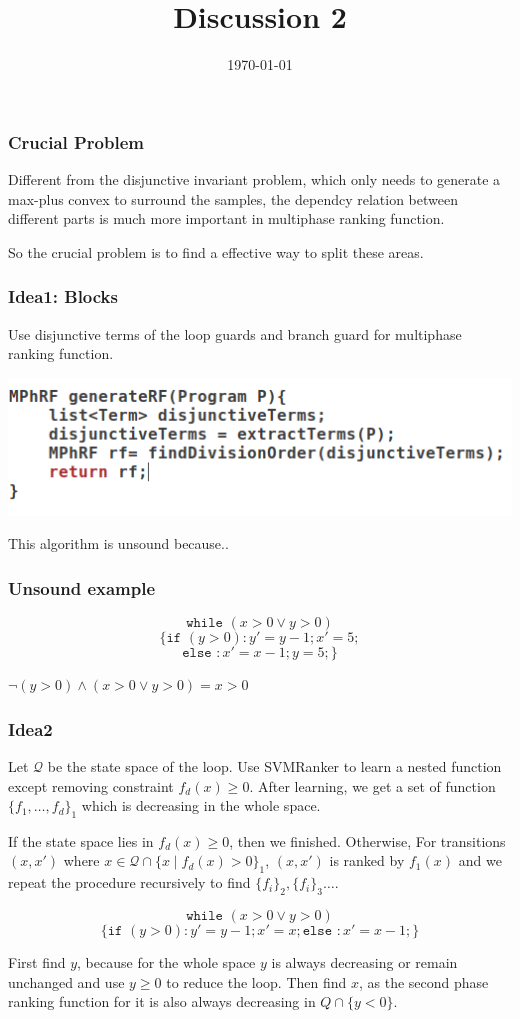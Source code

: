 \documentclass[10pt]{beamer}
\title{Discussion 2}
\date{\today}
\begin{document}
\maketitle


\begin{frame}\frametitle{Crucial Problem}
Different from the disjunctive invariant problem, which only needs to generate a max-plus convex to surround the samples, the dependcy relation between different parts is much more important in multiphase ranking function.

So the crucial problem is to find a effective way to split these areas.

\end{frame}


\begin{frame}\frametitle{Idea1: Blocks}
Use disjunctive terms of the loop guards and branch guard for multiphase ranking function.
\begin{center}
\includegraphics[scale=0.5]{2.png}
\end{center}
This algorithm is unsound because..
\end{frame}


\begin{frame}\frametitle{Unsound example}
\begin{example}

\[\texttt{while }(x > 0 \vee y > 0) \]
\[\{\texttt{if }(y > 0): y' = y - 1; x' = 5;\]
\[\texttt{else }: x' = x - 1; y = 5; \}\]


\end{example}
$\neg(y > 0) \wedge (x > 0 \vee y > 0) = x > 0$
\end{frame}

\begin{frame}\frametitle{Idea2}
Let $\mathcal{Q}$ be the state space of the loop.
Use SVMRanker to learn a nested function except removing constraint $f_d(x) \ge 0$.
After learning, we get a set of function $\{f_1,\ldots, f_d\}_1$ which is decreasing in the whole space.

If the state space lies in $f_d(x) \ge 0$, then we finished. Otherwise,
For transitions $(x, x')$ where $x \in \mathcal{Q}\cap \{x\mid f_d(x) > 0\}_1$, $(x, x')$ is ranked by $f_1(x)$ and we repeat the procedure recursively to find $\{f_i\}_2, \{f_i\}_3\ldots$.
\begin{example}

\[\texttt{while }(x > 0 \vee y > 0) \]
\[\{\texttt{if }(y > 0): y' = y - 1; x ' = x;\texttt{else }: x' = x - 1;\}\]
\end{example}

First find $y$, because for the whole space $y$ is always decreasing or remain unchanged and use $y \ge 0$ to reduce the loop.
Then find $x$, as the second phase ranking function for it is also always decreasing in $Q\cap \{y < 0\}$.
\end{frame}
\end{document}
